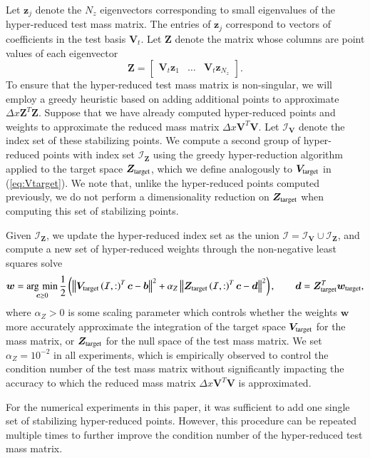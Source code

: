 \documentclass[preprint,10pt]{elsarticle}
\theoremstyle{definition}
\theoremstyle{lemma}
\theoremstyle{theorem}
\theoremstyle{assumption}
\DeclareMathOperator*{\argmin}{\arg\,\min}
\newcommand{\nor}[1]{\left\| #1 \right\|}
\newcommand{\LRp}[1]{\left( #1 \right)}
\begin{document}
Let $\bm{z}_j$ denote the $N_z$ eigenvectors corresponding to small eigenvalues of the hyper-reduced test mass matrix.  The entries of $\bm{z}_j$ correspond to vectors of coefficients in the test basis $\bm{V}_t$.  Let $\bm{Z}$ denote the matrix whose columns are point values of each eigenvector
\[
\bm{Z} = \begin{bmatrix}
\bm{V}_t\bm{z}_1 & \ldots & \bm{V}_t\bm{z}_{N_z}
\end{bmatrix}.
\]
To ensure that the hyper-reduced test mass matrix is non-singular, we will employ a greedy heuristic based on adding additional points to approximate $\Delta x\bm{Z}^T\bm{Z}$.  Suppose that we have already computed hyper-reduced points and weights to approximate the reduced mass matrix $\Delta x\bm{V}^T\bm{V}$.   Let $\mathcal{I}_{\bm{V}}$ denote the index set of these stabilizing points.  We compute a second group of hyper-reduced points with index set $\mathcal{I}_{\bm{Z}}$  using the greedy hyper-reduction algorithm applied to the target space $\bm{Z}_{\rm target}$, which we define analogously to $\bm{V}_{\rm target}$ in (\ref{eq:Vtarget}).  We note that, unlike the hyper-reduced points computed previously, we do not perform a dimensionality reduction on $\bm{Z}_{\rm target}$ when computing this set of stabilizing points.

Given $\mathcal{I}_{\bm{Z}}$, we update the hyper-reduced index set as the union $\mathcal{I} = \mathcal{I}_{\bm{V}} \cup \mathcal{I}_{\bm{Z}}$, and compute a new set of hyper-reduced weights through the non-negative least squares solve
\[
\bm{w} = \argmin_{\bm{c} \geq 0} \frac{1}{2} \LRp{\nor{\bm{V}_{\rm target}\LRp{\mathcal{I},:}^T\bm{c} - \bm{b}}^2 + \alpha_Z\nor{\bm{Z}_{\rm target}\LRp{\mathcal{I},:}^T\bm{c} - \bm{d}}^2}, \qquad \bm{d} = \bm{Z}_{\rm target}^T\bm{w}_{\rm target},
\]  
where $\alpha_Z > 0$ is some scaling parameter which controls whether the weights $\bm{w}$ more accurately approximate the integration of the target space $\bm{V}_{\rm target}$ for the mass matrix, or $\bm{Z}_{\rm target}$ for the null space of the test mass matrix.  We set $\alpha_Z = 10^{-2}$ in all experiments, which is empirically observed to control the condition number of the test mass matrix without significantly impacting the accuracy to which the reduced mass matrix $\Delta x\bm{V}^T\bm{V}$ is approximated.  

For the numerical experiments in this paper, it was sufficient to add one single set of stabilizing hyper-reduced points.  However, this procedure can be repeated multiple times to further improve the condition number of the hyper-reduced test mass matrix.  
\end{document}
